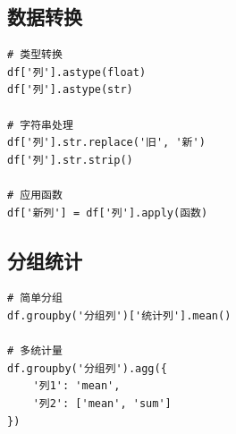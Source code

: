 \documentclass[12pt,a4paper]{article}
\begin{document}
\subsection{数据转换}

\begin{lstlisting}[caption={数据转换}]
# 类型转换
df['列'].astype(float)
df['列'].astype(str)

# 字符串处理
df['列'].str.replace('旧', '新')
df['列'].str.strip()

# 应用函数
df['新列'] = df['列'].apply(函数)
\end{lstlisting}

\subsection{分组统计}

\begin{lstlisting}[caption={分组统计}]
# 简单分组
df.groupby('分组列')['统计列'].mean()

# 多统计量
df.groupby('分组列').agg({
    '列1': 'mean',
    '列2': ['mean', 'sum']
})
\end{lstlisting}
\end{document}

